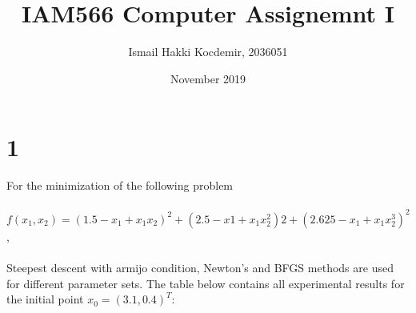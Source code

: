 \documentclass{article}
\title{IAM566 Computer Assignemnt I}
\author{Ismail Hakki Kocdemir, 2036051 }
\date{November 2019}
\begin{document}
\maketitle

\section*{1}
For the minimization of the following problem \\
\\
$f (x_1 , x_2 ) = (1.5 − x_1 + x_1 x_2 )^2 + (2.5 − x 1 + x_1 x_2^2 ) 2 + (2.625 − x_1 + x_1 x_2^3 )^2$, \\
\\
Steepest descent with armijo condition,  Newton's and BFGS methods are used for different parameter sets. The table below contains all experimental results for the initial point $x_0 = (3.1, 0.4)^T$: \\
\end{document}
